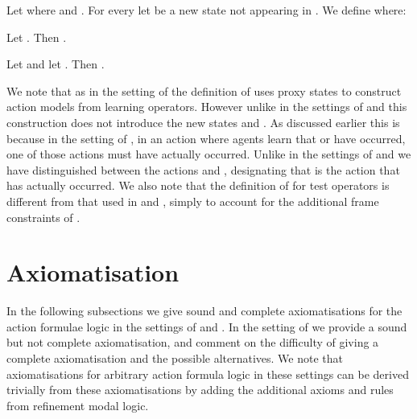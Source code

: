 \documentclass[twoside]{aiml14}
\begin{document}
  \begin{definition}[Learning]\label{afl-s-learning}
      Let  where 
       and
      .
      For every  let  be a new state not appearing in .
      We define  where:
      
  \end{definition}

  \begin{lemma}\label{afl-s-structure}
      Let . Then .
  \end{lemma}

  \begin{lemma}\label{afl-s-exec}
      Let  and 
      let .
      Then .
  \end{lemma}

  We note that as in the setting of \classKFF{} the definition of  uses
  proxy states to construct action models from learning operators. However
  unlike in the settings of \classK{} and \classKFF{} this construction does
  not introduce the new states  and . As
  discussed earlier this is because in the setting of \classS{}, in an action
  where agents learn that  or  have occurred, one of those
  actions must have actually occurred. Unlike in the settings of \classK{} and
  \classKFF{} we have distinguished between the actions  and ,
  designating that  is the action that has actually occurred. We also
  note that the definition of  for test operators is different from that
  used in \classK{} and \classKFF{}, simply to account for the additional frame
  constraints of \classS{}.

  \section{Axiomatisation}\label{axiomatisation}

  In the following subsections we give sound and complete axiomatisations for
  the action formulae logic in the settings of \classK{} and \classKFF{}. In
  the setting of \classS{} we provide a sound but not complete axiomatisation,
  and comment on the difficulty of giving a complete axiomatisation and the
  possible alternatives.
  We note that axiomatisations for arbitrary action formula logic in these
  settings can be derived trivially from these axiomatisations by adding the
  additional axioms and rules from refinement modal logic.

  \subsection{\classK{}}
\end{document}
